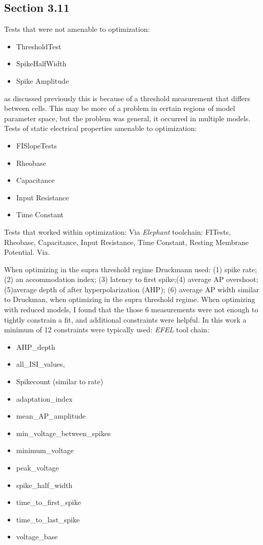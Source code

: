 



\subsection{Section 3.11}
Tests that were not amenable to optimization:
\begin{itemize}
\item ThresholdTest
\item SpikeHalfWidth
\item Spike Amplitude
\end{itemize}
as discussed previously this is because of a threshold measurement that differs between cells. This may be more of a problem in certain regions of model parameter space, but the problem was general, it occurred in multiple models.
Tests of static electrical properties amenable to optimization:
\begin{itemize}
\item FISlopeTests
\item Rheobase
\item Capacitance
\item Input Resistance
\item Time Constant 
\end{itemize}

Tests that worked within optimization:
Via \emph{Elephant} toolchain: FITests, Rheobase, Capacitance, Input Resistance, Time Constant, Resting Membrane Potential.
Via. 

When optimizing in the supra threshold regime Druckmann used:
(1) spike rate; (2) an accommodation index; (3) latency to first spike;(4) average AP overshoot; (5)average depth of after hyperpolarization (AHP); 
(6) average AP width similar to Druckman, when optimizing in the supra threshold regime.
When optimizing with reduced models, I found that the those 6 measurements were not enough to tightly constrain a fit, and additional constraints were helpful. In this work a minimum of 12 constraints were typically used:
\emph{EFEL} tool chain:
\begin{itemize}
\item AHP_depth
\item all_ISI_values,
\item Spikecount (similar to rate)
\item adaptation_index
\item mean_AP_amplitude  
\item min_voltage_between_spikes
\item minimum_voltage
\item peak_voltage
\item spike_half_width
\item time_to_first_spike
\item time_to_last_spike
\item voltage_base
\end{itemize}

